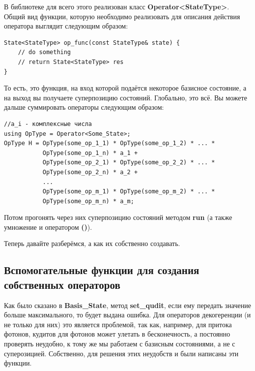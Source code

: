 \documentclass[12pt,fleqn]{article}
\begin{document}
        В библиотеке для всего этого реализован класс \textbf{Operator<StateType>}. 
        Общий вид функции, которую необходимо реализовать для описания действия оператора выглядит следующим образом:

\begin{mdframed}[linecolor=black, topline=true, bottomline=true,
leftline=false, rightline=false]
\begin{verbatim}
State<StateType> op_func(const StateType& state) {
    // do something
    // return State<StateType> res
}
\end{verbatim}
\end{mdframed}
        То есть, это функция, на вход которой подаётся некоторое базисное состояние, а на выход вы получаете суперпозицию состояний. Глобально, это всё.
        Вы можете дальше суммировать операторы следующим образом:

\begin{mdframed}[linecolor=black, topline=true, bottomline=true,
leftline=false, rightline=true]
\begin{verbatim}
//a_i - комплексные числа
using OpType = Operator<Some_State>;
OpType H = OpType(some_op_1_1) * OpType(some_op_1_2) * ... * 
           OpType(some_op_1_n) * a_1 + 
           OpType(some_op_2_1) * OpType(some_op_2_2) * ... *
           OpType(some_op_2_n) * a_2 +
           ...
           OpType(some_op_m_1) * OpType(some_op_m_2) * ... *
           OpType(some_op_m_n) * a_m;
\end{verbatim}
\end{mdframed}
    
        Потом прогонять через них суперпозицию состояний методом \textbf{run} (а также умножение и оператором \textbf{()}).

        Теперь давайте разберёмся, а как их собственно создавать.

        \subsection{Вспомогательные функции для создания собственных операторов}
        Как было сказано в \textbf{Basis\_State}, метод \textbf{set\_qudit}, если ему передать значение больше максимального, то будет выдана ошибка. Для операторов декогеренции (и не только для них) это 
        является проблемой, так как, например, для притока фотонов, кудитов для фотонов может улетать в бесконечность, а постоянно проверять неудобно, к тому же мы работаем с базисным состояниями, а 
        не с суперозицией. Собственно, для решения этих неудобств и были написаны эти функции.
\end{document}
